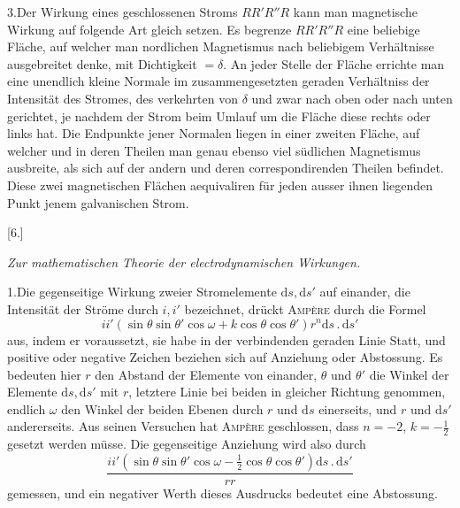 \par
{}
3.\quad Der Wirkung eines geschlossenen Stroms $RR'R''R$ kann man magnetische Wirkung auf folgende Art gleich setzen. Es begrenze $RR'R''R$ eine beliebige Fläche, auf welcher man nordlichen Magnetismus nach beliebigem Verhältnisse ausgebreitet denke, mit Dichtigkeit $=\delta$. An jeder Stelle der Fläche errichte man eine unendlich kleine Normale im zusammengesetzten geraden Verhältniss der Intensität des Stromes, des verkehrten von $\delta$ und zwar nach oben oder nach unten gerichtet, je nachdem der Strom beim Umlauf um die Fläche diese rechts oder links hat. Die Endpunkte jener Normalen liegen in einer zweiten Fläche, auf welcher und in deren Theilen man genau ebenso viel südlichen Magnetismus ausbreite, als sich auf der andern und deren correspondirenden Theilen befindet. Diese zwei magnetischen Flächen aequivaliren für jeden ausser ihnen liegenden Punkt jenem galvanischen Strom.

\begin{center}[6.]\par\medskip\textit{Zur mathematischen Theorie der electrodynamischen Wirkungen.}\end{center}
1.\quad Die gegenseitige Wirkung zweier Stromelemente $\mathrm ds,\mathrm ds'$ auf einander, die Intensität der Ströme durch $i,i'$ bezeichnet, drückt \textsc{Ampère} durch die Formel
\[
ii'(\sin\theta\sin\theta'\cos\omega+k\cos\theta\cos\theta')r^n\mathrm ds\,.\,\mathrm ds'
\]
aus, indem er voraussetzt, sie habe in der verbindenden geraden Linie Statt, und positive oder negative Zeichen beziehen sich auf Anziehung oder Abstossung. Es bedeuten hier $r$ den Abstand der Elemente von einander, $\theta$ und $\theta'$ die Winkel der Elemente $\mathrm ds,\mathrm ds'$ mit $r$, letztere Linie bei beiden in gleicher Richtung genommen, endlich $\omega$ den Winkel der beiden Ebenen durch $r$ und $\mathrm ds$ einerseits, und $r$ und $\mathrm ds'$ andererseits. Aus seinen Versuchen hat \textsc{Ampère} geschlossen, dass $n=-2$, $k=-\frac{1}{2}$ gesetzt werden müsse. Die gegenseitige Anziehung wird also durch
\[
\frac{ii'(\sin\theta\sin\theta'\cos\omega-\frac{1}{2}\cos\theta\cos\theta')\mathrm ds\,.\,\mathrm ds'}{rr}
\]
gemessen, und ein negativer Werth dieses Ausdrucks bedeutet eine Abstossung.

